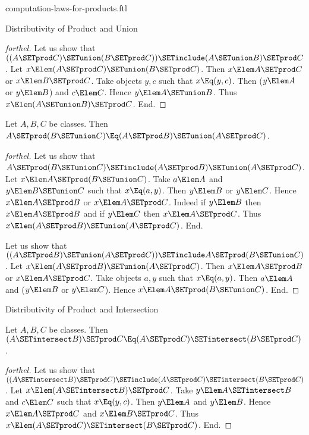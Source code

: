 \documentclass{stex}
\begin{document}
\begin{smodule}{computation-laws-for-products.ftl}
\begin{sfragment}{Distributivity of Product and Union}
\begin{proof}[forthel]
    Let us show that $((A \SETprod C) \SETunion (B \SETprod C)) \SETinclude (A \SETunion B) \SETprod C$. %
      Let $x \Elem (A \SETprod C) \SETunion (B \SETprod C)$.
      Then $x \Elem A \SETprod C$ or $x \Elem B \SETprod C$.
      Take objects $y, c$ such that $x \Eq (y, c)$.
      Then ($y \Elem A$ or $y \Elem B$) and $c \Elem C$.
      Hence $y \Elem A \SETunion B$.
      Thus $x \Elem (A \SETunion B) \SETprod C$.
    End.
  \end{proof}

  \begin{proposition}[forthel]
    Let $A, B, C$ be classes.
    Then $A \SETprod (B \SETunion C) \Eq (A \SETprod B) \SETunion (A \SETprod C)$.
  \end{proposition}
  \begin{proof}[forthel]
    Let us show that $A \SETprod (B \SETunion C) \SETinclude (A \SETprod B) \SETunion (A \SETprod C)$.
      Let $x \Elem A \SETprod (B \SETunion C)$.
      Take $a \Elem A$ and $y \Elem B \SETunion C$ such that $x \Eq (a, y)$.
      Then $y \Elem B$ or $y \Elem C$.
      Hence $x \Elem A \SETprod B$ or $x \Elem A \SETprod C$.
      Indeed if $y \Elem B$ then $x \Elem A \SETprod B$ and if $y \Elem C$ then $x \Elem A \SETprod C$.
      Thus $x \Elem (A \SETprod B) \SETunion (A \SETprod C)$.
    End.

    Let us show that $((A \SETprod B) \SETunion (A \SETprod C)) \SETinclude A \SETprod (B \SETunion C)$.
      Let $x \Elem (A \SETprod B) \SETunion (A \SETprod C)$.
      Then $x \Elem A \SETprod B$ or $x \Elem A \SETprod C$.
      Take objects $a, y$ such that $x \Eq (a, y)$.
      Then $a \Elem A$ and ($y \Elem B$ or $y \Elem C$).
      Hence $x \Elem A \SETprod (B \SETunion C)$.
    End.
  \end{proof}
\end{sfragment}

\begin{sfragment}{Distributivity of Product and Intersection}
  \begin{proposition}[forthel]
    Let $A, B, C$ be classes.
    Then $(A \SETintersect B) \SETprod C \Eq (A \SETprod C) \SETintersect (B \SETprod C)$.
  \end{proposition}
  \begin{proof}[forthel]
    Let us show that $((A \SETintersect B) \SETprod C) \SETinclude (A \SETprod C) \SETintersect (B \SETprod C)$. %
      Let $x \Elem (A \SETintersect B) \SETprod C$.
      Take $y \Elem A \SETintersect B$ and $c \Elem C$ such that $x \Eq (y, c)$.
      Then $y \Elem A$ and $y \Elem B$.
      Hence $x \Elem A \SETprod C$ and $x \Elem B \SETprod C$.
      Thus $x \Elem (A \SETprod C) \SETintersect (B \SETprod C)$.
    End.


\end{proof}
\end{sfragment}
\end{smodule}
\end{document}

